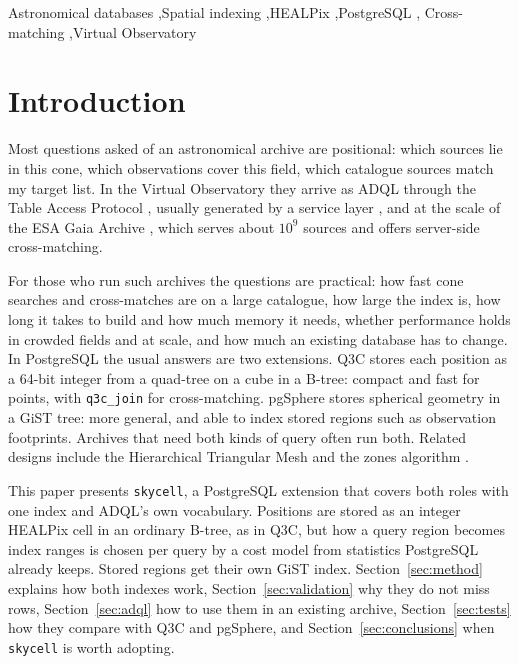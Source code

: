 \documentclass[final,5p,times,twocolumn,authoryear]{elsarticle}
\newcommand{\Sect}{Section}
\begin{document}
\begin{frontmatter}
\begin{keyword}
Astronomical databases \sep Spatial indexing \sep HEALPix \sep PostgreSQL \sep
Cross-matching \sep Virtual Observatory
\end{keyword}

\end{frontmatter}


\section{Introduction}

Most questions asked of an astronomical archive are positional: which sources lie in
this cone, which observations cover this field, which catalogue sources match my target
list. In the Virtual Observatory they arrive as ADQL \citep{adql}
through the Table Access Protocol \citep{tap}, usually generated by a service layer
\citep[e.g.][]{dachs}, and at the scale of the ESA Gaia Archive
\citep{gaiaarchive1, gaiaarchive2}, which serves about $10^9$ sources and offers
server-side cross-matching.

For those who run such archives the questions are practical: how fast cone searches
and cross-matches are on a large catalogue, how large the index is, how long it takes to
build and how much memory it needs, whether performance holds in crowded fields and at
scale, and how much an existing database has to change. In PostgreSQL the usual answers
are two extensions. Q3C
\citep{q3c} stores each position as a 64-bit integer from a quad-tree on a cube in a
B-tree: compact and fast for points, with \texttt{q3c\_join} for cross-matching.
pgSphere \citep{pgsphere} stores spherical geometry in a GiST tree: more general, and
able to index stored regions such as observation footprints. Archives that need both kinds of query often run both. Related designs
include the Hierarchical Triangular Mesh \citep{htm} and the zones algorithm
\citep{zones}.

This paper presents \texttt{skycell}, a PostgreSQL extension that covers both roles
with one index and ADQL's own vocabulary. Positions are stored as an integer HEALPix cell
in an ordinary B-tree, as in Q3C, but how a query region becomes index ranges is chosen
per query by a cost model from statistics PostgreSQL already keeps. Stored regions get
their own GiST index. \Sect~\ref{sec:method} explains how
both indexes work, \Sect~\ref{sec:validation} why they do not miss rows,
\Sect~\ref{sec:adql} how to use them in an existing archive, \Sect~\ref{sec:tests}
how they compare with Q3C and pgSphere, and \Sect~\ref{sec:conclusions} when
\texttt{skycell} is worth adopting.
\end{document}
